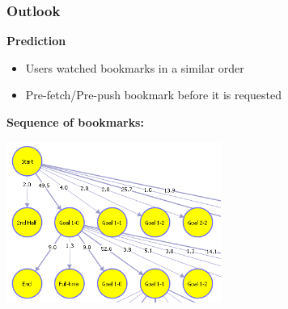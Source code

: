 \documentclass[xcolor=pdftex,dvipsnames,table]{beamer}
\begin{document}
\begin{frame}
    \frametitle{Outlook}

    \textbf{Prediction}
    \begin{itemize}
        \item Users watched bookmarks in a similar order
        \item Pre-fetch/Pre-push bookmark before it is requested
    \end{itemize}

    \textbf{Sequence of bookmarks:}
    \begin{center}
        \includegraphics[width=7cm]{sequence}
    \end{center}
\end{frame}
\end{document}
